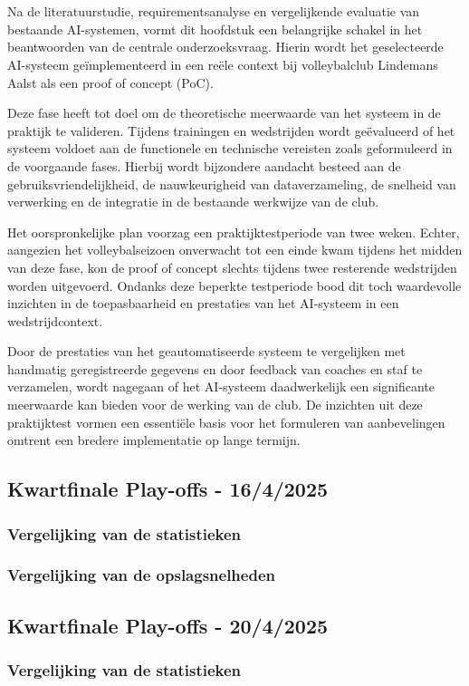 \chapter{}
\label{ch:poc}
Na de literatuurstudie, requirementsanalyse en vergelijkende evaluatie van bestaande AI-systemen, vormt dit hoofdstuk een belangrijke schakel in het beantwoorden van de centrale onderzoeksvraag. Hierin wordt het geselecteerde AI-systeem geïmplementeerd in een reële context bij volleybalclub Lindemans Aalst als een proof of concept (PoC).

Deze fase heeft tot doel om de theoretische meerwaarde van het systeem in de praktijk te valideren. Tijdens trainingen en wedstrijden wordt geëvalueerd of het systeem voldoet aan de functionele en technische vereisten zoals geformuleerd in de voorgaande fases. Hierbij wordt bijzondere aandacht besteed aan de gebruiksvriendelijkheid, de nauwkeurigheid van dataverzameling, de snelheid van verwerking en de integratie in de bestaande werkwijze van de club.

Het oorspronkelijke plan voorzag een praktijktestperiode van twee weken. Echter, aangezien het volleybalseizoen onverwacht tot een einde kwam tijdens het midden van deze fase, kon de proof of concept slechts tijdens twee resterende wedstrijden worden uitgevoerd. Ondanks deze beperkte testperiode bood dit toch waardevolle inzichten in de toepasbaarheid en prestaties van het AI-systeem in een wedstrijdcontext.

Door de prestaties van het geautomatiseerde systeem te vergelijken met handmatig geregistreerde gegevens en door feedback van coaches en staf te verzamelen, wordt nagegaan of het AI-systeem daadwerkelijk een significante meerwaarde kan bieden voor de werking van de club. De inzichten uit deze praktijktest vormen een essentiële basis voor het formuleren van aanbevelingen omtrent een bredere implementatie op lange termijn.

\section{Kwartfinale Play-offs - 16/4/2025}
\subsection{Vergelijking van de statistieken}




\subsection{Vergelijking van de opslagsnelheden}

\section{Kwartfinale Play-offs - 20/4/2025}
\subsection{Vergelijking van de statistieken}



